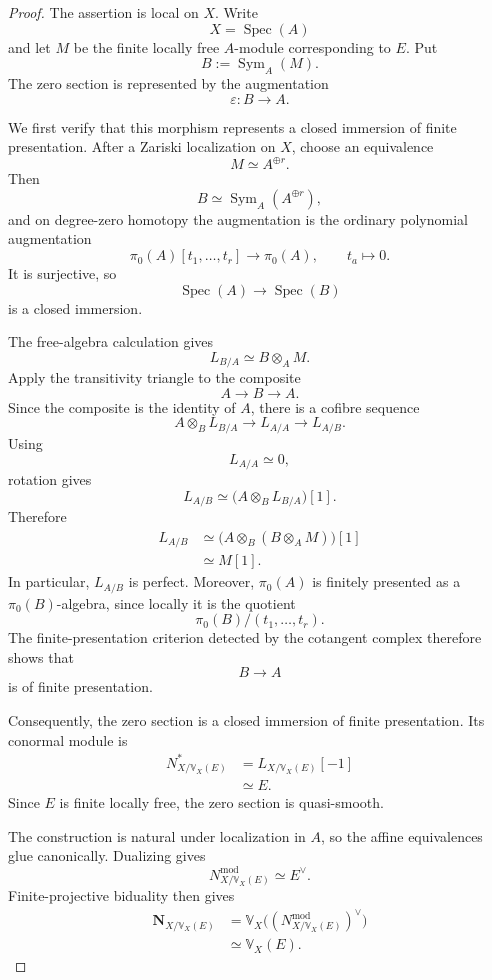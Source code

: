 \begin{proof}
The assertion is local on \(X\).  Write
\[
    X=\operatorname{Spec}(A)
\]
and let \(M\) be the finite locally free \(A\)-module corresponding to
\(E\).  Put
\[
    B:=\operatorname{Sym}_A(M).
\]
The zero section is represented by the augmentation
\[
    \varepsilon:B\longrightarrow A.
\]

We first verify that this morphism represents a closed immersion of finite
presentation.  After a Zariski localization on \(X\), choose an equivalence
\[
    M\simeq A^{\oplus r}.
\]
Then
\[
    B\simeq
    \operatorname{Sym}_A(A^{\oplus r}),
\]
and on degree-zero homotopy the augmentation is the ordinary polynomial
augmentation
\[
    \pi_0(A)[t_1,\ldots,t_r]
    \longrightarrow
    \pi_0(A),
    \qquad
    t_a\longmapsto0.
\]
It is surjective, so
\[
    \operatorname{Spec}(A)
    \longrightarrow
    \operatorname{Spec}(B)
\]
is a closed immersion.

The free-algebra calculation gives
\[
    L_{B/A}
    \simeq
    B\otimes_A M.
\]
Apply the transitivity triangle to the composite
\[
    A\longrightarrow B\longrightarrow A.
\]
Since the composite is the identity of \(A\), there is a cofibre sequence
\[
    A\otimes_B L_{B/A}
    \longrightarrow
    L_{A/A}
    \longrightarrow
    L_{A/B}.
\]
Using
\[
    L_{A/A}\simeq0,
\]
rotation gives
\[
    L_{A/B}
    \simeq
    \bigl(A\otimes_B L_{B/A}\bigr)[1].
\]
Therefore
\[
\begin{aligned}
    L_{A/B}
    &\simeq
    \bigl(
      A\otimes_B(B\otimes_A M)
    \bigr)[1] \\
    &\simeq
    M[1].
\end{aligned}
\]
In particular, \(L_{A/B}\) is perfect.  Moreover,
\(\pi_0(A)\) is finitely presented as a \(\pi_0(B)\)-algebra, since locally
it is the quotient
\[
    \pi_0(B)/(t_1,\ldots,t_r).
\]
The finite-presentation criterion detected by the cotangent complex therefore
shows that
\[
    B\longrightarrow A
\]
is of finite presentation.

Consequently, the zero section is a closed immersion of finite presentation.
Its conormal module is
\[
\begin{aligned}
    N^*_{X/\mathbb V_X(E)}
    &=
    L_{X/\mathbb V_X(E)}[-1] \\
    &\simeq
    E.
\end{aligned}
\]
Since \(E\) is finite locally free, the zero section is quasi-smooth.

The construction is natural under localization in \(A\), so the affine
equivalences glue canonically.  Dualizing gives
\[
    N^{\mathrm{mod}}_{X/\mathbb V_X(E)}
    \simeq
    E^\vee.
\]
Finite-projective biduality then gives
\[
\begin{aligned}
    \mathbf N_{X/\mathbb V_X(E)}
    &=
    \mathbb V_X
    \bigl(
      (N^{\mathrm{mod}}_{X/\mathbb V_X(E)})^\vee
    \bigr) \\
    &\simeq
    \mathbb V_X(E).
\end{aligned}
\]
\end{proof}


